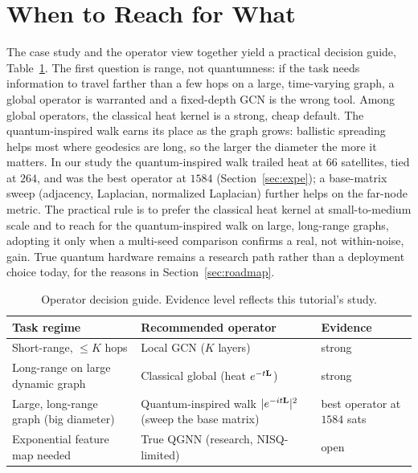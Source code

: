 \section{When to Reach for What}
\label{sec:decision}

The case study and the operator view together yield a practical decision guide,
Table~\ref{tab:decision}. The first question is range, not quantumness: if the task
needs information to travel farther than a few hops on a large, time-varying graph, a
global operator is warranted and a fixed-depth GCN is the wrong tool. Among global
operators, the classical heat kernel is a strong, cheap default. The quantum-inspired
walk earns its place as the graph grows: ballistic spreading helps most where geodesics
are long, so the larger the diameter the more it matters. In our study the
quantum-inspired walk trailed heat at $66$ satellites, tied at $264$, and was the best
operator at $1584$ (Section~\ref{sec:expe}); a base-matrix sweep (adjacency, Laplacian,
normalized Laplacian) further helps on the far-node metric. The practical rule is to
prefer the classical heat kernel at small-to-medium scale and to reach for the
quantum-inspired walk on large, long-range graphs, adopting it only when a multi-seed
comparison confirms a real, not within-noise, gain. True quantum hardware remains a research path rather than
a deployment choice today, for the reasons in Section~\ref{sec:roadmap}.

\begin{table}[t]
\centering
\caption{Operator decision guide. Evidence level reflects this tutorial's study.}
\label{tab:decision}
\renewcommand{\arraystretch}{1.25}
\begin{tabular}{@{}p{}p{}p{}@{}}
\toprule
Task regime & Recommended operator & Evidence \\
\midrule
Short-range, $\le K$ hops & Local GCN ($K$ layers) & strong \\
Long-range on large dynamic graph & Classical global (heat $e^{-t\mathbf{L}}$) & strong \\
Large, long-range graph (big diameter) & Quantum-inspired walk $|e^{-it\mathbf{L}}|^2$ (sweep the base matrix) & best operator at $1584$ sats \\
Exponential feature map needed & True QGNN (research, NISQ-limited) & open \\
\bottomrule
\end{tabular}
\end{table}
